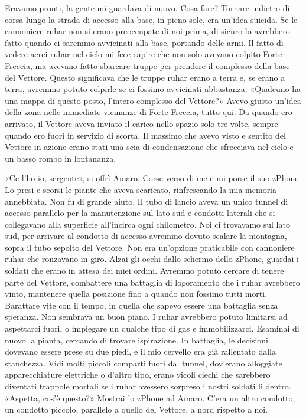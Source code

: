 Eravamo pronti, la gente mi guardava di nuovo. Cosa fare? Tornare
indietro di corsa lungo la strada di accesso alla base, in pieno sole,
era un'idea suicida. Se le cannoniere ruhar non si erano preoccupate di
noi prima, di sicuro lo avrebbero fatto quando ci saremmo avvicinati
alla base, portando delle armi. Il fatto di vedere aerei ruhar nel cielo
mi fece capire che non solo avevano colpito Forte Freccia, ma avevano
fatto sbarcare truppe per prendere il complesso della base del Vettore.
Questo significava che le truppe ruhar erano a terra e, se erano a
terra, avremmo potuto colpirle se ci fossimo avvicinati abbastanza.
«Qualcuno ha una mappa di questo posto, l'intero complesso del Vettore?»
Avevo giusto un'idea della zona nelle immediate vicinanze di Forte
Freccia, tutto qui. Da quando ero arrivato, il Vettore aveva inviato il
carico nello spazio solo tre volte, sempre quando ero fuori in servizio
di scorta. Il massimo che avevo visto e sentito del Vettore in azione
erano stati una scia di condensazione che sfrecciava nel cielo e un
basso rombo in lontananza.

\hfill\break

«Ce l'ho io, sergente», si offrì Amaro. Corse verso di me e mi porse il
suo zPhone. Lo presi e scorsi le piante che aveva scaricato,
rinfrescando la mia memoria annebbiata. Non fu di grande aiuto. Il tubo
di lancio aveva un unico tunnel di accesso parallelo per la manutenzione
sul lato sud e condotti laterali che si collegavano alla superficie
all'incirca ogni chilometro. Noi ci trovavamo sul lato sud, per arrivare
al condotto di accesso avremmo dovuto scalare la montagna, sopra il tubo
sepolto del Vettore. Non era un'opzione praticabile con cannoniere ruhar
che ronzavano in giro. Alzai gli occhi dallo schermo dello zPhone,
guardai i soldati che erano in attesa dei miei ordini. Avremmo potuto
cercare di tenere parte del Vettore, combattere una battaglia di
logoramento che i ruhar avrebbero vinto, mantenere quella posizione fino
a quando non fossimo tutti morti. Barattare vite con il tempo, in quella
che sapevo essere una battaglia senza speranza. Non sembrava un buon
piano. I ruhar avrebbero potuto limitarsi ad aspettarci fuori, o
impiegare un qualche tipo di gas e immobilizzarci. Esaminai di nuovo la
pianta, cercando di trovare ispirazione. In battaglia, le decisioni
dovevano essere prese su due piedi, e il mio cervello era già rallentato
dalla stanchezza. Vidi molti piccoli comparti fuori dal tunnel,
dov'erano alloggiate apparecchiature elettriche o d'altro tipo, erano
vicoli ciechi che sarebbero diventati trappole mortali se i ruhar
avessero sorpreso i nostri soldati lì dentro. «Aspetta, cos'è questo?»
Mostrai lo zPhone ad Amaro. C'era un altro condotto, un condotto
piccolo, parallelo a quello del Vettore, a nord rispetto a noi.

